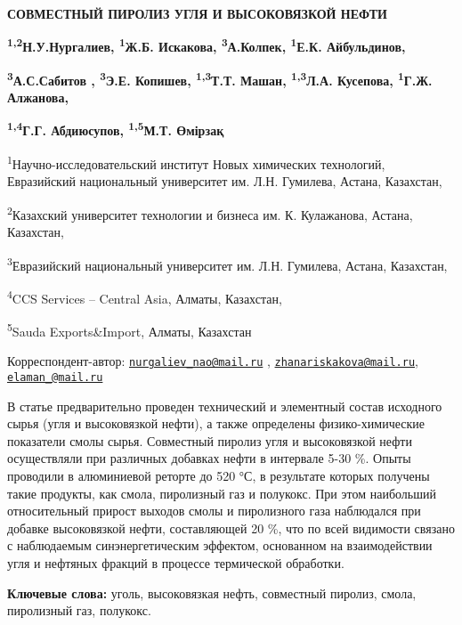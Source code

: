 
{\bfseries СОВМЕСТНЫЙ ПИРОЛИЗ УГЛЯ И ВЫСОКОВЯЗКОЙ НЕФТИ}

{\bfseries \textsuperscript{1,2}Н.У.Нургалиев\textsuperscript{\envelope },
\textsuperscript{1}Ж.Б. Искакова\textsuperscript{\envelope },
\textsuperscript{3}А.Колпек, \textsuperscript{1}Е.К.
Айбульдинов\textsuperscript{\envelope },}

{\bfseries \textsuperscript{3}А.С.Сабитов , \textsuperscript{3}Э.Е.
Копишев, \textsuperscript{1,3}Т.Т. Машан, \textsuperscript{1,3}Л.А.
Кусепова, \textsuperscript{1}Г.Ж. Алжанова,}

{\bfseries \textsuperscript{1,4}Г.Г. Абдиюсупов, \textsuperscript{1,5}М.Т.
Өмірзақ}

\textsuperscript{1}Научно-исследовательский институт Новых химических
технологий, Евразийский национальный университет им. Л.Н. Гумилева,
Астана, Казахстан,

\textsuperscript{2}Казахский университет технологии и бизнеса им. К.
Кулажанова, Астана, Казахстан,

\textsuperscript{3}Евразийский национальный университет им. Л.Н.
Гумилева, Астана, Казахстан,

\textsuperscript{4}CCS Services -- Central Asia, Алматы, Казахстан,

\textsuperscript{5}Sauda Exports\&Import, Алматы, Казахстан

{\bfseries \textsuperscript{\envelope }} Корреспондент-автор:
\href{mailto:nurgaliev_nao@mail.ru}{\nolinkurl{nurgaliev\_nao@mail.ru}}
,
\href{mailto:zhanariskakova@mail.ru}{\nolinkurl{zhanariskakova@mail.ru}},
\href{mailto:elaman_@mail.ru}{\nolinkurl{elaman\_@mail.ru}}

В статье предварительно проведен технический и элементный состав
исходного сырья (угля и высоковязкой нефти), а также определены
физико-химические показатели смолы сырья. Совместный пиролиз угля и
высоковязкой нефти осуществляли при различных добавках нефти в интервале
5-30 \%. Опыты проводили в алюминиевой реторте до 520 °С, в результате
которых получены такие продукты, как смола, пиролизный газ и полукокс.
При этом наибольший относительный прирост выходов смолы и пиролизного
газа наблюдался при добавке высоковязкой нефти, составляющей 20 \%, что
по всей видимости связано с наблюдаемым синэнергетическим эффектом,
основанном на взаимодействии угля и нефтяных фракций в процессе
термической обработки.

{\bfseries Ключевые слова:} уголь, высоковязкая нефть, совместный пиролиз,
смола, пиролизный газ, полукокс.

